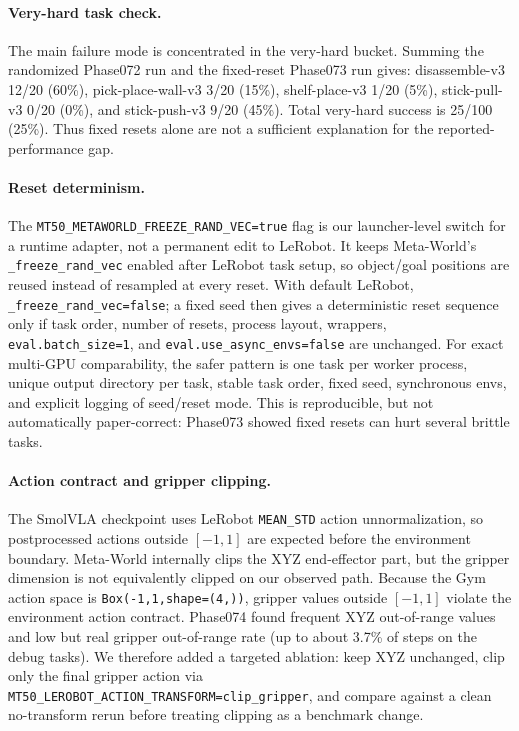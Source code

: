 \documentclass{article}
\begin{document}
\paragraph{Very-hard task check.}
The main failure mode is concentrated in the very-hard bucket.  Summing the randomized Phase072 run and the fixed-reset Phase073 run gives: disassemble-v3 12/20 (60\%), pick-place-wall-v3 3/20 (15\%), shelf-place-v3 1/20 (5\%), stick-pull-v3 0/20 (0\%), and stick-push-v3 9/20 (45\%).  Total very-hard success is 25/100 (25\%).  Thus fixed resets alone are not a sufficient explanation for the reported-performance gap.

\paragraph{Reset determinism.}
The \texttt{MT50\_METAWORLD\_FREEZE\_RAND\_VEC=true} flag is our launcher-level switch for a runtime adapter, not a permanent edit to LeRobot.  It keeps Meta-World's \texttt{\_freeze\_rand\_vec} enabled after LeRobot task setup, so object/goal positions are reused instead of resampled at every reset.  With default LeRobot, \texttt{\_freeze\_rand\_vec=false}; a fixed seed then gives a deterministic reset sequence only if task order, number of resets, process layout, wrappers, \texttt{eval.batch\_size=1}, and \texttt{eval.use\_async\_envs=false} are unchanged.  For exact multi-GPU comparability, the safer pattern is one task per worker process, unique output directory per task, stable task order, fixed seed, synchronous envs, and explicit logging of seed/reset mode.  This is reproducible, but not automatically paper-correct: Phase073 showed fixed resets can hurt several brittle tasks.

\paragraph{Action contract and gripper clipping.}
The SmolVLA checkpoint uses LeRobot \texttt{MEAN\_STD} action unnormalization, so postprocessed actions outside \([-1,1]\) are expected before the environment boundary.  Meta-World internally clips the XYZ end-effector part, but the gripper dimension is not equivalently clipped on our observed path.  Because the Gym action space is \texttt{Box(-1,1,shape=(4,))}, gripper values outside \([-1,1]\) violate the environment action contract.  Phase074 found frequent XYZ out-of-range values and low but real gripper out-of-range rate (up to about 3.7\% of steps on the debug tasks).  We therefore added a targeted ablation: keep XYZ unchanged, clip only the final gripper action via \texttt{MT50\_LEROBOT\_ACTION\_TRANSFORM=clip\_gripper}, and compare against a clean no-transform rerun before treating clipping as a benchmark change.
\end{document}
